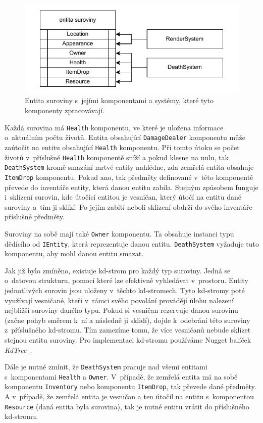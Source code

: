 \begin{figure}[!htb]
  \centering
  \includegraphics[width=0.8\linewidth]{img/resource.pdf}
  \caption{Entita suroviny s~jejími komponentami a systémy, které tyto komponenty zpracovávají.}
  \label{fig:resource}
\end{figure}

Každá surovina má \texttt{Health} komponentu, ve které je uložena informace o~aktuálním počtu životů. Entita obsahující \texttt{DamageDealer} komponentu může zaútočit na entitu obsahující \texttt{Health} komponentu. Při tomto útoku se počet životů v~příslušné \texttt{Health} komponentě sníží a pokud klesne na nulu, tak \texttt{DeathSystem} kromě smazání mrtvé entity nahlédne, zda zemřelá entita obsahuje \texttt{ItemDrop} komponentu. Pokud ano, tak předměty definované v~této komponentě převede do inventáře entity, která danou entitu zabila. Stejným způsobem funguje i~sklízení surovin, kde útočící entitou je vesničan, který útočí na entitu dané suroviny a~tím ji sklízí. Po jejím zabití neboli sklizení obdrží do svého inventáře příslušné předměty.

Suroviny na sobě mají také \texttt{Owner} komponentu. Ta obsahuje instanci typu dědícího od \texttt{IEntity}, která reprezentuje danou entitu. \texttt{DeathSystem} vyžaduje tuto komponentu, aby mohl danou entitu smazat.

Jak již bylo zmíněno, existuje kd-strom pro každý typ suroviny. Jedná se o~datovou strukturu, pomocí které lze efektivně vyhledávat v~prostoru. Entity jednotlivých surovin jsou uloženy v~těchto kd-stromech. Tyto kd-stromy poté využívají vesničané, kteří v~rámci svého povolání provádějí úlohu nalezení nejbližší suroviny daného typu. Pokud si vesničan rezervuje danou surovinu (začne pohyb směrem k~ní a následně ji sklidí), dojde k~odebrání této suroviny z~příslušného kd-stromu. Tím zamezíme tomu, že více vesničanů nebude sklízet stejnou entitu suroviny. Pro implementaci kd-stromu používáme Nugget balíček \textit{KdTree}~\cite{KdTree}.

Dále je nutné zmínit, že \texttt{DeathSystem} pracuje nad všemi entitami s~komponentami \texttt{Health} a \texttt{Owner}. V~případě, že zemřelá entita má na sobě komponentu \texttt{Inventory} nebo komponentu \texttt{ItemDrop}, tak převede dané předměty. A v~případě, že zemřelá entita je vesničan a ten útočil na entitu s~komponentou \texttt{Resource} (daná entita byla surovina), tak je nutné entitu vrátit do příslušného kd-stromu.

